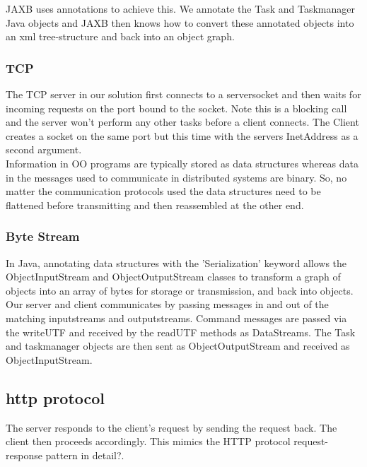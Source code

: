 JAXB uses annotations to achieve this. We annotate the Task and Taskmanager  Java objects and JAXB then knows how to convert these annotated objects into an xml tree-structure and back into an object graph.\\

\subsubsection{TCP}
The TCP server in our solution first connects to a serversocket and then waits for incoming requests on the port bound to the socket. Note this is a blocking call and the server won't perform any other tasks before a client connects. The Client creates a socket on the same port but this time with the servers InetAddress as a second argument. \\


Information in OO programs are typically stored as data structures whereas data in the messages used to communicate in distributed systems are binary. So, no matter the communication protocols used the data structures need to be flattened before transmitting and then reassembled at the other end. \\ 

\subsubsection{Byte Stream}
In Java, annotating data structures with the 'Serialization' keyword allows the ObjectInputStream and ObjectOutputStream classes to transform a graph of objects into an array of bytes for storage or transmission, and back into objects. \\

Our server and client communicates by passing messages in and out of the matching inputstreams and outputstreams. Command messages are passed via the writeUTF and received by the readUTF methods as  DataStreams. The Task and taskmanager objects are then sent as ObjectOutputStream and received as ObjectInputStream. \\



\subsection{http protocol}

The server responds to the client’s request by sending the request back. The client then proceeds accordingly. This mimics the HTTP protocol request-response pattern in detail?.

